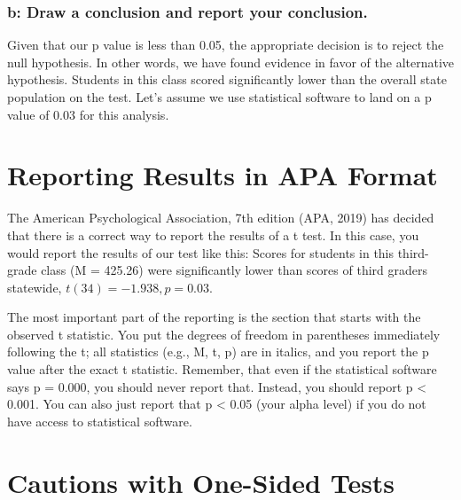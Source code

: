 \documentclass[
  letterpaper,
  DIV=11,
  numbers=noendperiod]{scrreprt}
\begin{document}
\subsubsection*{b: Draw a conclusion and report your
conclusion.}\label{b-draw-a-conclusion-and-report-your-conclusion.}

Given that our p value is less than 0.05, the appropriate decision is to
reject the null hypothesis. In other words, we have found evidence in
favor of the alternative hypothesis. Students in this class scored
significantly lower than the overall state population on the test. Let's
assume we use statistical software to land on a p value of 0.03 for this
analysis.

\section{Reporting Results in APA
Format}\label{reporting-results-in-apa-format}

The American Psychological Association, 7th edition (APA, 2019) has
decided that there is a correct way to report the results of a t test.
In this case, you would report the results of our test like this: Scores
for students in this third-grade class (M = 425.26) were significantly
lower than scores of third graders statewide,
\(t(34) = -1.938, p = 0.03\).

The most important part of the reporting is the section that starts with
the observed t statistic. You put the degrees of freedom in parentheses
immediately following the t; all statistics (e.g., M, t, p) are in
italics, and you report the p value after the exact t statistic.
Remember, that even if the statistical software says p = 0.000, you
should never report that. Instead, you should report p \textless{}
0.001. You can also just report that p \textless{} 0.05 (your alpha
level) if you do not have access to statistical software.

\section{Cautions with One-Sided
Tests}\label{cautions-with-one-sided-tests}
\end{document}
